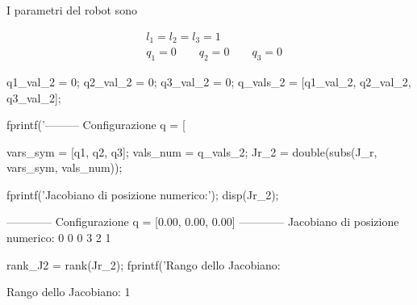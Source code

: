 \documentclass[11pt, a4paper]{article}
\begin{document}
\vspace{1em}


\begin{par}
\begin{flushleft}
I parametri del robot sono
\end{flushleft}
\end{par}
\begin{align*}
    & l_1 = l_2 = l_3 = 1 \\
    & q_{1} = 0 \qquad q_{2} = 0 \qquad q_{3} = 0
\end{align*}

\begin{matlabcode}
q1_val_2 = 0;
q2_val_2 = 0;
q3_val_2 = 0;
q_vals_2 = [q1_val_2, q2_val_2, q3_val_2];

fprintf('--------- Configurazione q = [%

vars_sym = [q1, q2, q3];
vals_num = q_vals_2;
Jr_2 = double(subs(J_r, vars_sym, vals_num));

fprintf('Jacobiano di posizione numerico:\n');
disp(Jr_2);
\end{matlabcode}
\begin{matlaboutput}
------------ Configurazione q = [0.00, 0.00, 0.00] ------------
Jacobiano di posizione numerico:
     0     0     0
     3     2     1
\end{matlaboutput}
\newpage
\begin{matlabcode}
rank_J2 = rank(Jr_2);
fprintf('Rango dello Jacobiano: %
\end{matlabcode}
\begin{matlaboutput}
Rango dello Jacobiano: 1
\end{matlaboutput}
\end{document}
